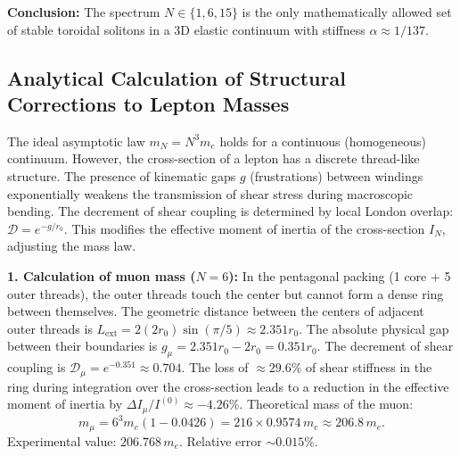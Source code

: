 \documentclass[11pt,a4paper]{article}
\begin{document}
	\textbf{Conclusion:} The spectrum $N \in \{1, 6, 15\}$ is the only mathematically allowed set of stable toroidal solitons in a 3D elastic continuum with stiffness $\alpha \approx 1/137$.
	
\subsection{Analytical Calculation of Structural Corrections to Lepton Masses}
	The ideal asymptotic law $m_N = N^3 m_e$ holds for a continuous (homogeneous) continuum. However, the cross-section of a lepton has a discrete thread-like structure. The presence of kinematic gaps $g$ (frustrations) between windings exponentially weakens the transmission of shear stress during macroscopic bending. The decrement of shear coupling is determined by local London overlap: $\mathcal{D} = e^{-g / r_0}$. This modifies the effective moment of inertia of the cross-section $I_N$, adjusting the mass law.
	
	\textbf{1. Calculation of muon mass ($N=6$):} 
	In the pentagonal packing (1 core + 5 outer threads), the outer threads touch the center but cannot form a dense ring between themselves. The geometric distance between the centers of adjacent outer threads is $L_{\text{ext}} = 2(2r_0) \sin(\pi/5) \approx 2.351 r_0$. The absolute physical gap between their boundaries is $g_\mu = 2.351 r_0 - 2 r_0 = 0.351 r_0$.
	The decrement of shear coupling is $\mathcal{D}_\mu = e^{-0.351} \approx 0.704$. 
	The loss of $\approx 29.6\%$ of shear stiffness in the ring during integration over the cross-section leads to a reduction in the effective moment of inertia by $\Delta I_\mu / I^{(0)} \approx -4.26\%$. 
	Theoretical mass of the muon:
	\begin{equation}
		m_\mu = 6^3 m_e (1 - 0.0426) = 216 \times 0.9574 \, m_e \approx 206.8 \, m_e.
	\end{equation}
	Experimental value: $206.768 \, m_e$. Relative error $\sim 0.015\%$.
	
\end{document}
